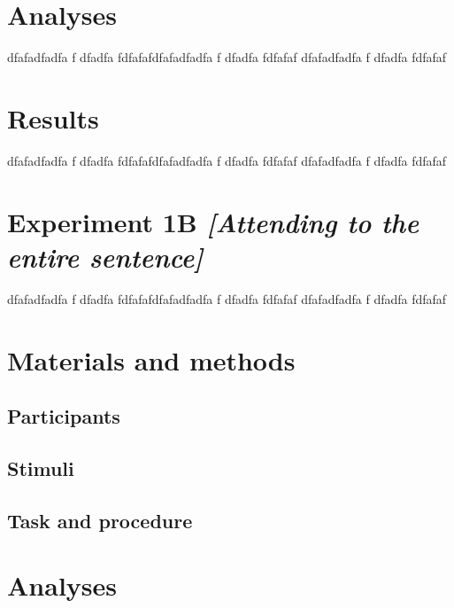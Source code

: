 \documentclass[a4paper, nobind]{templates/ociamthesis}
\begin{document}
\hypertarget{analyses}{%
\section{Analyses}\label{analyses}}

dfafadfadfa f
dfadfa
fdfafafdfafadfadfa f
dfadfa
fdfafaf
dfafadfadfa f
dfadfa
fdfafaf

\hypertarget{results}{%
\section{Results}\label{results}}

dfafadfadfa f
dfadfa
fdfafafdfafadfadfa f
dfadfa
fdfafaf
dfafadfadfa f
dfadfa
fdfafaf

\hypertarget{experiment-1b-attending-to-the-entire-sentence}{%
\section{\texorpdfstring{Experiment 1B \emph{{[}Attending to the entire sentence{]}}}{Experiment 1B {[}Attending to the entire sentence{]}}}\label{experiment-1b-attending-to-the-entire-sentence}}

dfafadfadfa f
dfadfa
fdfafafdfafadfadfa f
dfadfa
fdfafaf
dfafadfadfa f
dfadfa
fdfafaf

\hypertarget{materials-and-methods-1}{%
\section{Materials and methods}\label{materials-and-methods-1}}

\hypertarget{participants-1}{%
\subsection{Participants}\label{participants-1}}

\hypertarget{stimuli-1}{%
\subsection{Stimuli}\label{stimuli-1}}

\hypertarget{task-and-procedure-1}{%
\subsection{Task and procedure}\label{task-and-procedure-1}}

\hypertarget{analyses-1}{%
\section{Analyses}\label{analyses-1}}
\end{document}
